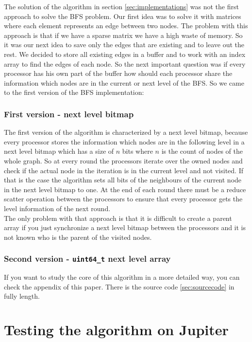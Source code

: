 \documentclass[12pt,a4paper]{article}
\begin{document}
The solution of the algorithm in section \ref{sec:implementations} was not the first approach to solve the BFS problem. Our first idea was to solve it with matrices where each element represents an edge between two nodes. The problem with this approach is that if we have a sparse matrix we have a high waste of memory. So it was our next idea to save only the edges that are existing and to leave out the rest. We decided to store all existing edges in a buffer and to work with an index array to find the edges of each node. So the next important question was if every processor has his own part of the buffer how should each processor share the information which nodes are in the current or next level of the BFS. So we came to the first version of the BFS implementation:

\subsubsection{First version - next level bitmap}

The first version of the algorithm is characterized by a next level bitmap, because every processor stores the information which nodes are in the following level in a next level bitmap which has a size of \(n\) bits where \(n\) is the count of nodes of the whole graph. So at every round the processors iterate over the owned nodes and check if the actual node in the iteration is in the current level and not visited. If that is the case the algorithm sets all bits of the neighbours of the current node in the next level bitmap to one. At the end of each round there must be a reduce scatter operation between the processors to ensure that every processor gets the level information of the next round.\\
The only problem with that approach is that it is difficult to create a parent array if you just synchronize a next level bitmap between the processors and it is not known who is the parent of the visited nodes.

\subsubsection{Second version - \lstinline{uint64_t} next level array}

If you want to study the core of this algorithm in a more detailed way, you can check the appendix of this paper. There is the source code \ref{sec:sourcecode} in fully length.



\section{Testing the algorithm on Jupiter}
\label{sec:testing}
\end{document}
